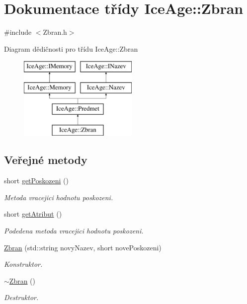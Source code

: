 \hypertarget{classIceAge_1_1Zbran}{}\section{Dokumentace třídy Ice\+Age\+:\+:Zbran}
\label{classIceAge_1_1Zbran}


{\ttfamily \#include $<$Zbran.\+h$>$}

Diagram dědičnosti pro třídu Ice\+Age\+:\+:Zbran\begin{figure}[H]
\begin{center}
\leavevmode
\includegraphics[height=4.000000cm]{d1/d47/classIceAge_1_1Zbran}
\end{center}
\end{figure}
\subsection*{Veřejné metody}
\begin{DoxyCompactItemize}
\item 
short \hyperlink{classIceAge_1_1Zbran_ad12a2508c6983fad25c307a8b0b7d467}{get\+Poskozeni} ()
\begin{DoxyCompactList}\small\item\em Metoda vracejici hodnotu poskozeni. \end{DoxyCompactList}\item 
short \hyperlink{classIceAge_1_1Zbran_ae5be95775a3d4d3ac85b6a731dc35413}{get\+Atribut} ()
\begin{DoxyCompactList}\small\item\em Podedena metoda vracejici hodnotu poskozeni. \end{DoxyCompactList}\item 
\hyperlink{classIceAge_1_1Zbran_a075c0a805d1fa11a79c795dcb65720d5}{Zbran} (std\+::string novy\+Nazev, short nove\+Poskozeni)
\begin{DoxyCompactList}\small\item\em Konstruktor. \end{DoxyCompactList}\item 
\hyperlink{classIceAge_1_1Zbran_abd3e919129605818d5aca1cc4e3c12c7}{$\sim$\+Zbran} ()
\begin{DoxyCompactList}\small\item\em Destruktor. \end{DoxyCompactList}\end{DoxyCompactItemize}
